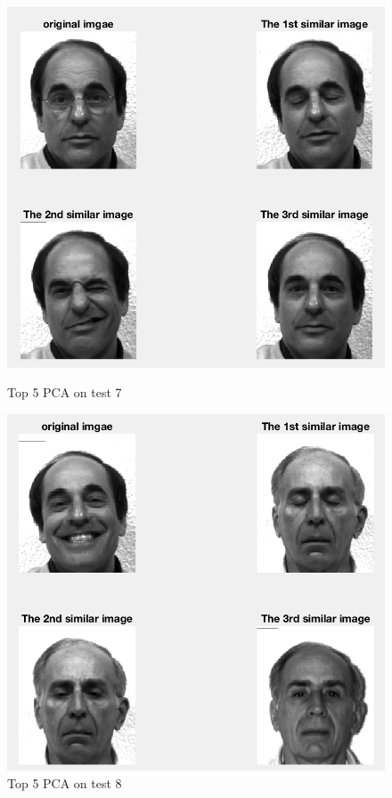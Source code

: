 \documentclass{article}
\begin{document}
\begin{figure}[htbp]
\centering
\begin{minipage}[t]{0.48\textwidth}
\centering
\includegraphics[scale = 0.3]{5_7.png}
\caption{Top 5 PCA on test 7}
\end{minipage}
\begin{minipage}[t]{0.48\textwidth}
\centering
\includegraphics[scale = 0.3]{5_8.png}
\caption{Top 5 PCA on test 8}
\end{minipage}
\end{figure}
\end{document}
